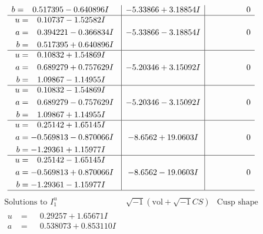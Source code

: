 \documentclass[1p]{elsarticle_modified}
\theoremstyle{definition}
\newcommand{\I}{\sqrt{-1}}
\begin{document}
$$\begin{array}{c|c|c}
\begin{aligned}
b &= \phantom{-}0.517395 - 0.640896 I\end{aligned}
 & -5.33866 + 3.18854 I & \phantom{-0.000000 } 0 \\ \hline\begin{aligned}
u &= \phantom{-}0.10737 - 1.52582 I \\
a &= \phantom{-}0.394221 - 0.366834 I \\
b &= \phantom{-}0.517395 + 0.640896 I\end{aligned}
 & -5.33866 - 3.18854 I & \phantom{-0.000000 } 0 \\ \hline\begin{aligned}
u &= \phantom{-}0.10832 + 1.54869 I \\
a &= \phantom{-}0.689279 + 0.757629 I \\
b &= \phantom{-}1.09867 - 1.14955 I\end{aligned}
 & -5.20346 + 3.15092 I & \phantom{-0.000000 } 0 \\ \hline\begin{aligned}
u &= \phantom{-}0.10832 - 1.54869 I \\
a &= \phantom{-}0.689279 - 0.757629 I \\
b &= \phantom{-}1.09867 + 1.14955 I\end{aligned}
 & -5.20346 - 3.15092 I & \phantom{-0.000000 } 0 \\ \hline\begin{aligned}
u &= \phantom{-}0.25142 + 1.65145 I \\
a &= -0.569813 - 0.870066 I \\
b &= -1.29361 + 1.15977 I\end{aligned}
 & -8.6562 + 19.0603 I & \phantom{-0.000000 } 0 \\ \hline\begin{aligned}
u &= \phantom{-}0.25142 - 1.65145 I \\
a &= -0.569813 + 0.870066 I \\
b &= -1.29361 - 1.15977 I\end{aligned}
 & -8.6562 - 19.0603 I & \phantom{-0.000000 } 0\\
 \hline 
 \end{array}$$\newpage$$\begin{array}{c|c|c}  
\text{Solutions to }I^u_{1}& \I (\text{vol} + \sqrt{-1}CS) & \text{Cusp shape}\\
 \hline 
\begin{aligned}
u &= \phantom{-}0.29257 + 1.65671 I \\
a &= \phantom{-}0.538073 + 0.853110 I \\

\end{aligned}
\end{array}$$
\end{document}
